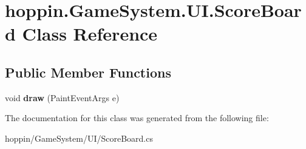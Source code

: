 \hypertarget{classhoppin_1_1_game_system_1_1_u_i_1_1_score_board}{}\section{hoppin.\+Game\+System.\+U\+I.\+Score\+Board Class Reference}
\label{classhoppin_1_1_game_system_1_1_u_i_1_1_score_board}
\subsection*{Public Member Functions}
\begin{DoxyCompactItemize}
\item 
void {\bfseries draw} (Paint\+Event\+Args e)\hypertarget{classhoppin_1_1_game_system_1_1_u_i_1_1_score_board_a76cab46ef5d0c5b8348b309510d099fa}{}\label{classhoppin_1_1_game_system_1_1_u_i_1_1_score_board_a76cab46ef5d0c5b8348b309510d099fa}

\end{DoxyCompactItemize}


The documentation for this class was generated from the following file\+:\begin{DoxyCompactItemize}
\item 
hoppin/\+Game\+System/\+U\+I/Score\+Board.\+cs\end{DoxyCompactItemize}
